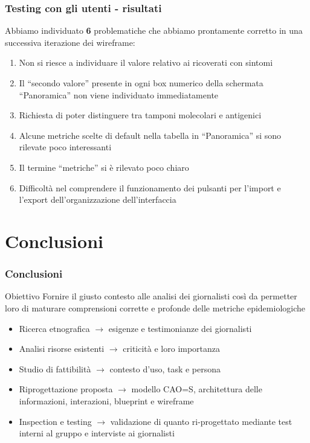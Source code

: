 \documentclass[handout]{beamer}
\begin{document}
		\begin{frame}
			\frametitle{Testing con gli utenti - risultati}
			Abbiamo individuato \textbf{6} problematiche che abbiamo prontamente corretto in una successiva iterazione dei wireframe:
			\begin{enumerate}[<+->]
				\item Non si riesce a individuare il valore relativo ai ricoverati con sintomi\\
				\item Il ``secondo valore'' presente in ogni box numerico della schermata ``Panoramica'' non viene individuato immediatamente\\
				\item Richiesta di poter distinguere tra tamponi molecolari e antigenici\\
				\item Alcune metriche scelte di default nella tabella in ``Panoramica'' si sono rilevate poco interessanti\\
				\item Il termine ``metriche'' si è rilevato poco chiaro\\
				\item Difficoltà nel comprendere il funzionamento dei pulsanti per l'import e l'export dell'organizzazione dell'interfaccia\\
			\end{enumerate}
		\end{frame}

	\section{Conclusioni}
		\begin{frame}
			\frametitle{Conclusioni}
			\begin{block}{Obiettivo}
				Fornire il giusto contesto alle analisi dei giornalisti così da permetter loro di maturare comprensioni corrette e profonde delle metriche epidemiologiche
			\end{block}
			\begin{itemize}[<+->]
				\item Ricerca etnografica $\rightarrow$ esigenze e testimonianze dei giornalisti\\
				\item Analisi risorse esistenti $\rightarrow$ criticità e loro importanza\\
				\item Studio di fattibilità $\rightarrow$ contesto d'uso, task e persona\\
				\item Riprogettazione proposta $\rightarrow$ modello CAO=S, architettura delle informazioni, interazioni, blueprint e wireframe\\
				\item Inspection e testing $\rightarrow$ validazione di quanto ri-progettato mediante test interni al gruppo e interviste ai giornalisti\\
			\end{itemize}
		\end{frame}
\end{document}
